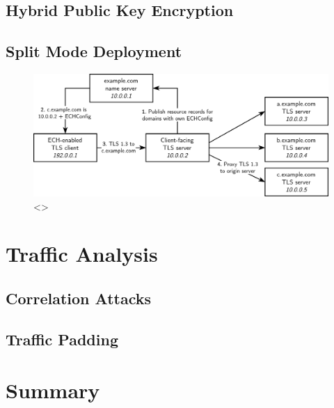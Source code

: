 \blindtext

\subsection{Hybrid Public Key Encryption}

\blindtext

\subsection{Split Mode Deployment}

\blindtext

\begin{figure}[ht]
\centerline{\includegraphics[width=160mm]{images/ech-split-mode.png}}
\caption[Example ECH Split Mode deployment]{<>}
\label{ech_split_mode_figure}
\end{figure}








\section{Traffic Analysis}

\blindtext

\subsection{Correlation Attacks}

\blindtext

\subsection{Traffic Padding}

\blindtext








\section{Summary}

\blindtext
